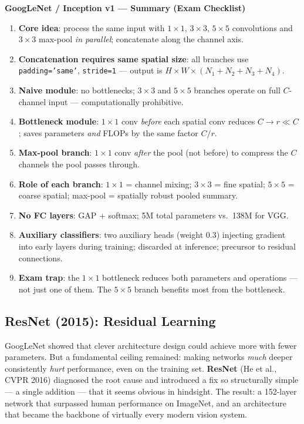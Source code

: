 \documentclass[11pt,a4paper]{article}
\newcommand{\term}[1]{\textcolor{DefGreen}{\textbf{#1}}\index{#1}}
\begin{document}
\begin{tcolorbox}[colback=WarningRedBg,colframe=WarningRed,boxrule=0.8pt,arc=3pt]
\textbf{GoogLeNet / Inception v1 — Summary (Exam Checklist)}
\begin{enumerate}
  \item \textbf{Core idea}: process the same input with $1\times1$, $3\times3$, $5\times5$
    convolutions and $3\times3$ max-pool \emph{in parallel}; concatenate along the channel axis.
  \item \textbf{Concatenation requires same spatial size}: all branches use
    \texttt{padding='same'}, \texttt{stride=1} — output is $H\times W\times(N_1+N_2+N_3+N_4)$.
  \item \textbf{Naive module}: no bottlenecks; $3\times3$ and $5\times5$ branches operate on full
    $C$-channel input — computationally prohibitive.
  \item \textbf{Bottleneck module}: $1\times1$ conv \emph{before} each spatial conv reduces
    $C \to r \ll C$; saves parameters \emph{and} FLOPs by the same factor $C/r$.
  \item \textbf{Max-pool branch}: $1\times1$ conv \emph{after} the pool (not before) to compress
    the $C$ channels the pool passes through.
  \item \textbf{Role of each branch}: $1\times1$ = channel mixing; $3\times3$ = fine spatial;
    $5\times5$ = coarse spatial; max-pool = spatially robust pooled summary.
  \item \textbf{No FC layers}: GAP + softmax; 5M total parameters vs.\ 138M for VGG.
  \item \textbf{Auxiliary classifiers}: two auxiliary heads (weight 0.3) injecting gradient into
    early layers during training; discarded at inference; precursor to residual connections.
  \item \textbf{Exam trap}: the $1\times1$ bottleneck reduces both parameters and operations —
    not just one of them.  The $5\times5$ branch benefits most from the bottleneck.
\end{enumerate}
\end{tcolorbox}

\subsection{ResNet (2015): Residual Learning}
\label{sec:resnet}

GoogLeNet showed that clever architecture design could achieve more with fewer parameters.
But a fundamental ceiling remained: making networks \emph{much} deeper consistently
\emph{hurt} performance, even on the training set.  \term{ResNet} (He et al., CVPR 2016)
diagnosed the root cause and introduced a fix so structurally simple — a single addition
— that it seems obvious in hindsight.  The result: a 152-layer network that surpassed human
performance on ImageNet, and an architecture that became the backbone of virtually every
modern vision system.
\end{document}
